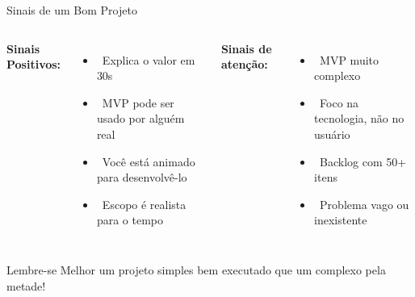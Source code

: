 \documentclass[10pt]{beamer}
\begin{document}
\begin{frame}{Sinais de um Bom Projeto}
\begin{columns}[c]
\textbf{Sinais Positivos:}
\begin{itemize}
    \item \checkmark\ Explica o valor em 30s
    \item \checkmark\ MVP pode ser usado por alguém real
    \item \checkmark\ Você está animado para desenvolvê-lo
    \item \checkmark\ Escopo é realista para o tempo
\end{itemize}

\textbf{Sinais de atenção:}
\begin{itemize}
    \item {}\ MVP muito complexo
    \item {}\ Foco na tecnologia, não no usuário
    \item {}\ Backlog com 50+ itens
    \item {}\ Problema vago ou inexistente
\end{itemize}
\end{columns}

\vspace{0.5cm}
\begin{alertblock}{Lembre-se}
Melhor um projeto simples bem executado que um complexo pela metade!
\end{alertblock}
\end{frame}
\end{document}
